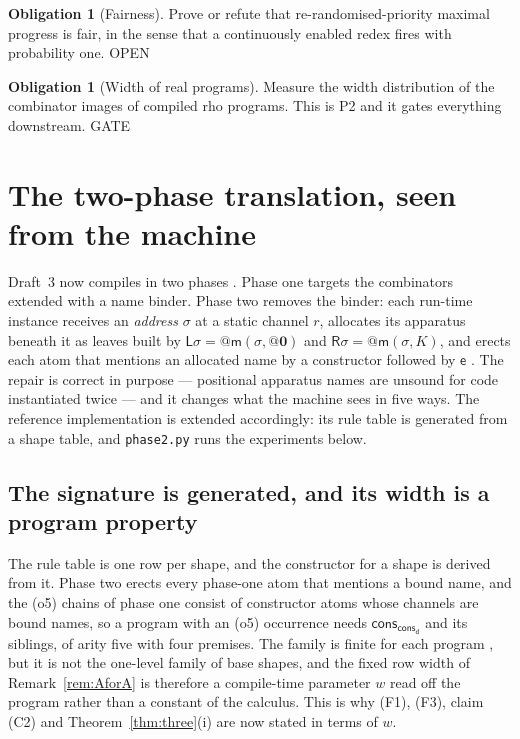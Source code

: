 \documentclass[11pt,a4paper]{article}
\makeatletter
\theoremstyle{plain}
\theoremstyle{definition}
\newtheorem{obligation}[theorem]{Obligation}
\theoremstyle{remark}
\newcommand{\rhoc}{\textsf{rho}}
\newcommand{\quo}[1]{@#1}
\newcommand{\nil}{\mathbf{0}}
\newcommand{\mm}{\mathsf{m}}
\newcommand{\dd}{\mathsf{d}}
\newcommand{\ev}{\mathsf{e}}
\newcommand{\Lft}{\mathsf{L}}
\newcommand{\Rgt}{\mathsf{R}}
\newcommand{\cons}{\mathsf{cons}}
\makeatother
\begin{document}
\begin{obligation}[Fairness]
\label{obl:fair}
Prove or refute that re-randomised-priority maximal progress is fair, in the
sense that a continuously enabled redex fires with probability one.
\textsf{OPEN}
\end{obligation}

\begin{obligation}[Width of real programs]
\label{obl:width}
Measure the width distribution of the combinator images of compiled \rhoc{}
programs. This is P2 and it gates everything downstream.
\textsf{GATE}
\end{obligation}

\section{The two-phase translation, seen from the machine}
\label{sec:phase2}

Draft~3 now compiles in two phases \cite[\S6]{rhocomb3}. Phase one targets the
combinators extended with a name binder. Phase two removes the binder: each
run-time instance receives an \emph{address} $\sigma$ at a static channel $r$,
allocates its apparatus beneath it as leaves built by $\Lft\sigma =
\quo{\mm(\sigma,\quo{\nil})}$ and $\Rgt\sigma = \quo{\mm(\sigma,K)}$, and
erects each atom that mentions an allocated name by a constructor followed by
$\ev$ \cite[Rem.~3.11, Def.~6.8]{rhocomb3}. The repair is correct in purpose
--- positional apparatus names are unsound for code instantiated twice
\cite[\S6.1]{rhocomb3} --- and it changes what the machine sees in five ways.
The reference implementation is extended accordingly: its rule table is
generated from a shape table, and \texttt{phase2.py} runs the experiments
below.

\subsection{The signature is generated, and its width is a program property}

The rule table is one row per shape, and the constructor for a shape is
derived from it. Phase two erects every phase-one atom that mentions a bound
name, and the (o5) chains of phase one consist of constructor atoms whose
channels are bound names, so a program with an (o5) occurrence needs
$\cons_{\cons_{\dd}}$ and its siblings, of arity five with four premises.
The family is finite for each program \cite[Rem.~6.15]{rhocomb3}, but it is
not the one-level family of base shapes, and the fixed row width of
Remark~\ref{rem:AforA} is therefore a compile-time parameter $w$ read off the
program rather than a constant of the calculus. This is why (F1), (F3), claim
(C2) and Theorem~\ref{thm:three}(i) are now stated in terms of $w$.
\end{document}
